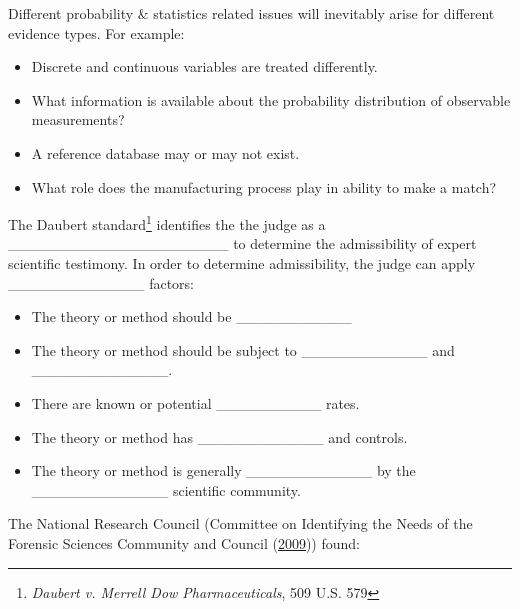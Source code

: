 \documentclass[]{book}
\providecommand{\tightlist}{%
  \setlength{\itemsep}{0pt}\setlength{\parskip}{0pt}}
\let\rmarkdownfootnote\footnote%
\def\footnote{\protect\rmarkdownfootnote}
\theoremstyle{definition}
\theoremstyle{definition}
\theoremstyle{remark}
\begin{document}
Different probability \& statistics related issues will inevitably arise
for different evidence types. For example:

\begin{itemize}
\tightlist
\item
  Discrete and continuous variables are treated differently.
\item
  What information is available about the probability distribution of
  observable measurements?
\item
  A reference database may or may not exist.
\item
  What role does the manufacturing process play in ability to make a
  match?
\end{itemize}

The Daubert standard\footnote{\emph{Daubert v. Merrell Dow
  Pharmaceuticals}, 509 U.S. 579} identifies the the judge as a
\_\_\_\_\_\_\_\_\_\_\_\_\_\_\_\_\_\_\_\_\_ to determine the
admissibility of expert scientific testimony. In order to determine
admissibility, the judge can apply \_\_\_\_\_\_\_\_\_\_\_\_\_ factors:
\vspace{.1in}

\begin{itemize}
\tightlist
\item
  The theory or method should be \_\_\_\_\_\_\_\_\_\_\_ \vspace{.1in}
\item
  The theory or method should be subject to \_\_\_\_\_\_\_\_\_\_\_\_ and
  \_\_\_\_\_\_\_\_\_\_\_\_\_. \vspace{.1in}
\item
  There are known or potential \_\_\_\_\_\_\_\_\_\_ rates.\vspace{.1in}
\item
  The theory or method has \_\_\_\_\_\_\_\_\_\_\_\_ and
  controls.\vspace{.1in}
\item
  The theory or method is generally \_\_\_\_\_\_\_\_\_\_\_\_ by the
  \_\_\_\_\_\_\_\_\_\_\_\_\_ scientific community.
\end{itemize}

The National Research Council (Committee on Identifying the Needs of the
Forensic Sciences Community and Council
(\protect\hyperlink{ref-nrc09}{2009})) found:\vspace{.1in}
\end{document}
